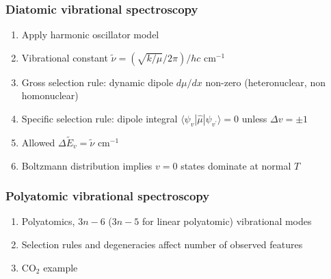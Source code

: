 \documentclass[11pt]{article}
\begin{document}
\subsubsection{Diatomic vibrational spectroscopy}
\label{sec:org0a2fa71}
\begin{enumerate}
\item Apply harmonic oscillator model
\item Vibrational constant \(\tilde{\nu} = (\sqrt{k/\mu}/2\pi)/hc\) cm\(^{-1}\)
\item Gross selection rule: dynamic dipole \(d\mu/dx\) non-zero (heteronuclear, non homonuclear)
\item Specific selection rule: dipole integral \(\langle \psi_v|\hat\mu|\psi_{v^\prime} \rangle =0\)
unless \(\Delta v = \pm 1\)
\item Allowed \(\Delta \tilde{E}_v = \tilde{\nu}\) cm\(^{-1}\)
\item Boltzmann distribution implies \(v=0\) states dominate at normal \(T\)
\end{enumerate}
\subsubsection{Polyatomic vibrational spectroscopy}
\label{sec:org1c3b271}
\begin{enumerate}
\item Polyatomics, \(3n-6\) (\(3n-5\) for linear polyatomic) vibrational modes
\item Selection rules and degeneracies affect number of observed features
\item CO\(_2\) example
\end{enumerate}
\end{document}
